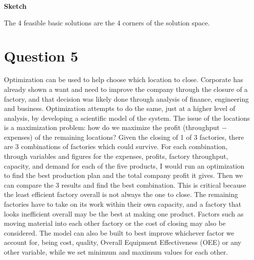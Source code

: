 \documentclass{article}
\begin{document}
\begin{minipage}{\linewidth}
\textbf{Sketch}

\end{minipage}

The 4 feasible basic solutions are the 4 corners of the solution space.

\section*{Question 5}
Optimization can be used to help choose which location to close. Corporate has already shown a want and need to improve the company through the closure of a factory, and that decision was likely done through analysis of finance, engineering and business. Optimization attempts to do the same, just at a higher level of analysis, by developing a scientific model of the system. The issue of the locations is a maximization problem: how do we maximize the profit (throughput $-$ expenses) of the remaining locations? Given the closing of 1 of 3 factories, there are 3 combinations of factories which could survive. For each combination, through variables and figures for the expenses, profits, factory throughput, capacity, and demand for each of the five products, I would run an optimization to find the best production plan and the total company profit it gives. Then we can compare the 3 results and find the best combination. This is critical because the least efficient factory overall is not always the one to close. The remaining factories have to take on its work within their own capacity, and a factory that looks inefficient overall may be the best at making one product. Factors such as moving material into each other factory or the cost of closing may also be considered. The model can also be built to best improve whichever factor we account for, being cost, quality, Overall Equipment Effectiveness (OEE) or any other variable, while we set minimum and maximum values for each other.
\end{document}
